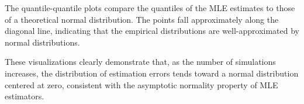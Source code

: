 The quantile-quantile plots compare the quantiles of the MLE estimates to those of a theoretical normal distribution. The points fall approximately along the diagonal line, indicating that the empirical distributions are well-approximated by normal distributions.

These visualizations clearly demonstrate that, as the number of simulations increases, the distribution of estimation errors tends toward a normal distribution centered at zero, consistent with the asymptotic normality property of MLE estimators.




    
    
    


